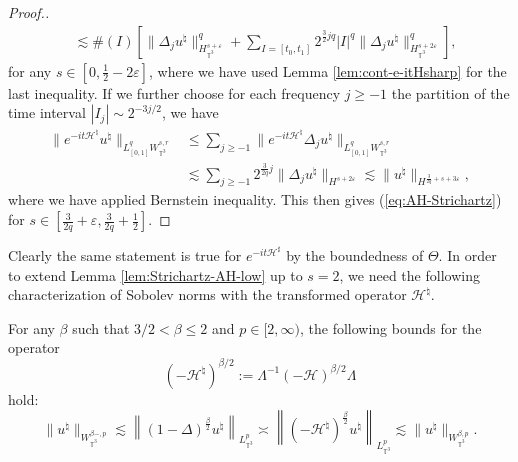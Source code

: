 \begin{proof}[Proof.]
\begin{equation*}
\begin{split}
    & \lesssim \# (I) \left[ \| \Delta_j u^{\natural}
    \|^q_{H_{\mathbb{T}^3}^{s + \varepsilon}} + \sum_{I = [t_0, t_1]}
    2^{\frac{3}{2} j q} | I | ^q \| \Delta_j u^{\natural} \|^q_{
    H_{\mathbb{T}^3}^{s + 2 \varepsilon}} \right],
  \end{split}
  \end{equation*}
  for any $s \in [0, \frac{1}{2} - 2 \varepsilon]$, where we have used Lemma
  \ref{lem:cont-e-itHsharp} for the last inequality. If we further choose for
  each frequency $j \geqslant - 1$ the partition of the time interval $| I_j |
  \sim 2^{- 3 j / 2}$, we have
  \begin{equation}
  \begin{split}
    \| e^{- i t \mathcal{H}^{\natural}} u^{\natural} \|_{L_{[0, 1]}^q W^{s,
    r}_{\mathbb{T}^3}} & \leq \sum_{j \geq - 1} {{\| e^{- i t
    {\mathcal{H}^{\natural}} } \Delta_j u^{\natural} \|_{L_{[0, 1]}^q
    W_{\mathbb{T}^3}^{s, r}}} }\\
     &\lesssim \sum_{j \geq - 1} {2 }^{\frac{3}{2
    q} j} \| \Delta_j u^{\natural} \|_{H^{s + 2 \varepsilon}} \lesssim \|
    u^{\natural} \|_{H^{\frac{3}{2 q} + s + 3 \varepsilon}},
    \end{split}
  \end{equation}
  where we have applied Bernstein inequality. This then gives
  (\ref{eq:AH-Strichartz}) for $s \in [\frac{3}{2q} + \varepsilon, \frac{3}{2q} + \frac{1}{2}]$.
\end{proof}

Clearly the same statement is true for $e^{- i t \mathcal{H}^{\sharp}}$ by the
boundedness of $\Theta .$ In order to extend Lemma \ref{lem:Strichartz-AH-low}
up to $s = 2$, we need the following characterization of Sobolev norms with
the transformed operator $\mathcal{H}^{\natural}$.

\begin{lem}
  \label{lem:space-equiv}For any $\beta$ such that $3 / 2 < \beta \leqslant 2$
  and $p \in [2, \infty)$, the following bounds for the operator
  \[ (- \mathcal{H}^{\natural})^{\beta / 2} := \Lambda^{- 1} (-
     \mathcal{H})^{\beta / 2} \Lambda \]
  hold:
  \begin{equation}
    \| u^{\natural} \|_{W_{\mathbb{T}^3}^{\beta -, p}} \lesssim \left\| (1 -
    \Delta)^{\frac{\beta}{2}} u^{\natural} \right\|_{L_{\mathbb{T}^3}^p}
    \asymp \left\| (- \mathcal{H}^{\natural})^{\frac{\beta}{2}} u^{\natural}
    \right\|_{L_{\mathbb{T}^3}^p} \lesssim \| u^{\natural}
    \|_{W_{\mathbb{T}^3}^{\beta, p}} . \label{eq:equiv-norm-Hb/2}
  \end{equation}
\end{lem}

